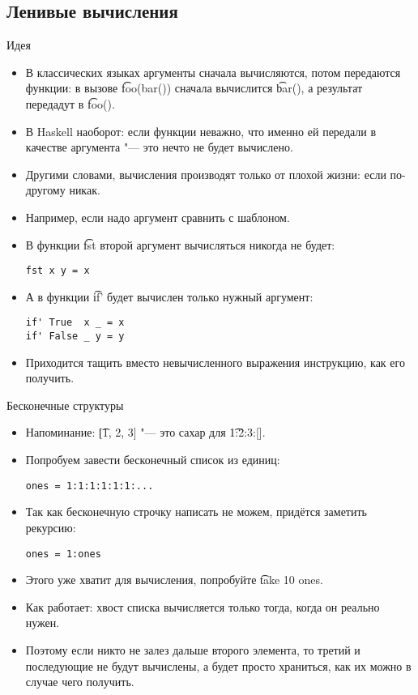 \subsection{Ленивые вычисления}

\begin{frame}
\end{frame}

\begin{frame}[fragile]{Идея}
	\begin{itemize}
		\item В классических языках аргументы сначала вычисляются, потом передаются функции: в вызове \t{foo(bar())} сначала вычислится \t{bar()}, а результат передадут в \t{foo()}.
		\item В Haskell наоборот: если функции неважно, что именно ей передали в качестве аргумента "--- это нечто не будет вычислено.
		\item Другими словами, вычисления производят только от плохой жизни: если по-другому никак.
		\item Например, если надо аргумент сравнить с шаблоном.
		\item В функции \t{fst} второй аргумент вычисляться никогда не будет:
\begin{verbatim}
fst x y = x
\end{verbatim}
		\item А в функции \t{if'} будет вычислен только нужный аргумент:
\begin{verbatim}
if' True  x _ = x
if' False _ y = y
\end{verbatim}
		\item Приходится тащить вместо невычисленного выражения инструкцию, как его получить.
	\end{itemize}
\end{frame}

\begin{frame}[fragile]{Бесконечные структуры}
	\begin{itemize}
		\item Напоминание: \t{[1, 2, 3]} "--- это сахар для \t{1:2:3:[]}.
		\item Попробуем завести бесконечный список из единиц:
\begin{verbatim}
ones = 1:1:1:1:1:1:...
\end{verbatim}
		\item Так как бесконечную строчку написать не можем, придётся заметить рекурсию:
\begin{verbatim}
ones = 1:ones
\end{verbatim}
		\item Этого уже хватит для вычисления, попробуйте \t{take 10 ones}.
		\item Как работает: хвост списка вычисляется только тогда, когда он реально нужен.
		\item Поэтому если никто не залез дальше второго элемента, то третий и последующие не будут вычислены, а будет просто храниться, как их можно в случае чего получить.
	\end{itemize}
\end{frame}

